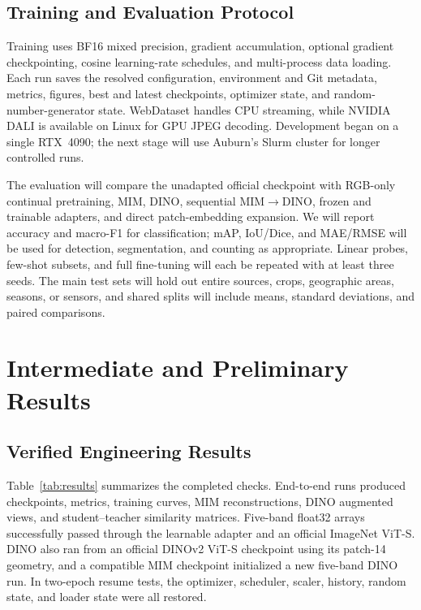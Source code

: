 \documentclass[10pt,twocolumn,letterpaper]{article}
\begin{document}
\subsection{Training and Evaluation Protocol}
Training uses BF16 mixed precision, gradient accumulation, optional gradient
checkpointing, cosine learning-rate schedules, and multi-process data loading.
Each run saves the resolved configuration, environment and Git metadata,
metrics, figures, best and latest checkpoints, optimizer state, and
random-number-generator state. WebDataset handles CPU streaming, while NVIDIA
DALI is available on Linux for GPU JPEG decoding. Development began on a single
RTX~4090; the next stage will use Auburn's Slurm cluster for longer controlled
runs.

The evaluation will compare the unadapted official checkpoint with RGB-only
continual pretraining, MIM, DINO, sequential MIM$\rightarrow$DINO, frozen and
trainable adapters, and direct patch-embedding expansion. We will report
accuracy and macro-F1 for classification; mAP, IoU/Dice, and MAE/RMSE will be
used for detection, segmentation, and counting as appropriate. Linear probes,
few-shot subsets, and full fine-tuning will each be repeated with at least three
seeds. The main test sets will hold out entire sources, crops, geographic areas,
seasons, or sensors, and shared splits will include means, standard deviations,
and paired comparisons.

\section{Intermediate and Preliminary Results}
\subsection{Verified Engineering Results}
Table~\ref{tab:results} summarizes the completed checks. End-to-end runs
produced checkpoints, metrics, training curves, MIM reconstructions, DINO
augmented views, and student--teacher similarity matrices. Five-band float32
arrays successfully passed through the learnable adapter and an official
ImageNet ViT-S. DINO also ran from an official DINOv2 ViT-S checkpoint using its
patch-14 geometry, and a compatible MIM checkpoint initialized a new five-band
DINO run. In two-epoch resume tests, the optimizer, scheduler, scaler, history,
random state, and loader state were all restored.
\end{document}
